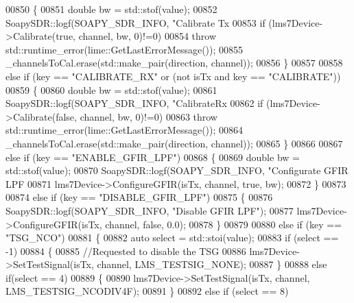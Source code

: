 \begin{DoxyCode}
{{{{{{{{{{{{{{00850     \{
00851         \textcolor{keywordtype}{double} bw = std::stof(value);
00852         SoapySDR::logf(SOAPY_SDR_INFO, \textcolor{stringliteral}{"Calibrate Tx %
00853         \textcolor{keywordflow}{if} (lms7Device->Calibrate(\textcolor{keyword}{true}, channel, bw, 0)!=0)
00854             \textcolor{keywordflow}{throw} std::runtime\_error(lime::GetLastErrorMessage());
00855         _channelsToCal.erase(std::make\_pair(direction, channel));
00856     \}
00857 
00858     \textcolor{keywordflow}{else} \textcolor{keywordflow}{if} (key == \textcolor{stringliteral}{"CALIBRATE\_RX"} or (not isTx and key == \textcolor{stringliteral}{"CALIBRATE"}))
00859     \{
00860         \textcolor{keywordtype}{double} bw = std::stof(value);
00861         SoapySDR::logf(SOAPY_SDR_INFO, \textcolor{stringliteral}{"CalibrateRx %
00862         \textcolor{keywordflow}{if} (lms7Device->Calibrate(\textcolor{keyword}{false}, channel, bw, 0)!=0)
00863             \textcolor{keywordflow}{throw} std::runtime\_error(lime::GetLastErrorMessage());
00864         _channelsToCal.erase(std::make\_pair(direction, channel));
00865     \}
00866 
00867     \textcolor{keywordflow}{else} \textcolor{keywordflow}{if} (key == \textcolor{stringliteral}{"ENABLE\_GFIR\_LPF"})
00868     \{
00869         \textcolor{keywordtype}{double} bw = std::stof(value);
00870         SoapySDR::logf(SOAPY_SDR_INFO, \textcolor{stringliteral}{"Configurate GFIR LPF %
00871         lms7Device->ConfigureGFIR(isTx, channel, \textcolor{keyword}{true}, bw);
00872     \}
00873 
00874     \textcolor{keywordflow}{else} \textcolor{keywordflow}{if}  (key == \textcolor{stringliteral}{"DISABLE\_GFIR\_LPF"})
00875     \{
00876         SoapySDR::logf(SOAPY_SDR_INFO, \textcolor{stringliteral}{"Disable GFIR LPF"});
00877         lms7Device->ConfigureGFIR(isTx, channel, \textcolor{keyword}{false}, 0.0);
00878     \}
00879 
00880     \textcolor{keywordflow}{else} \textcolor{keywordflow}{if} (key == \textcolor{stringliteral}{"TSG\_NCO"})
00881     \{
00882         \textcolor{keyword}{auto} select = std::stoi(value);
00883         \textcolor{keywordflow}{if} (select == -1)
00884         \{
00885             \textcolor{comment}{//Requested to disable the TSG}
00886             lms7Device->SetTestSignal(isTx, channel, LMS_TESTSIG_NONE);
00887         \}
00888         \textcolor{keywordflow}{else} \textcolor{keywordflow}{if}(select == 4)
00889         \{
00890             lms7Device->SetTestSignal(isTx, channel, LMS_TESTSIG_NCODIV4F);
00891         \}
00892         \textcolor{keywordflow}{else} \textcolor{keywordflow}{if} (select == 8)
}}}}}}}}}}}}}}}}}
\end{DoxyCode}

